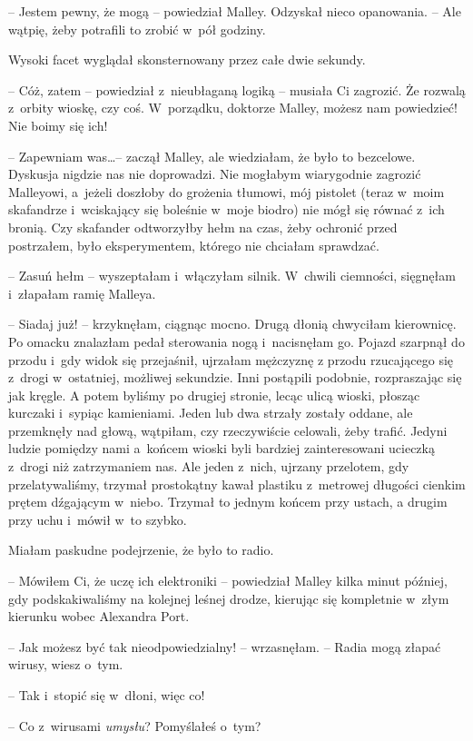 \documentclass[oneside,polish,11pt,sfheadings]{mwbk}
\begin{document}
-- Jestem pewny, że mogą -- powiedział Malley. Odzyskał nieco opanowania.
-- Ale wątpię, żeby potrafili to zrobić w~pół godziny.

Wysoki facet wyglądał skonsternowany przez całe dwie sekundy.

-- Cóż, zatem -- powiedział z~nieubłaganą logiką -- musiała Ci zagrozić. Że
rozwalą z~orbity wioskę, czy coś. W~porządku, doktorze Malley, możesz
nam powiedzieć! Nie boimy się ich!

-- Zapewniam was\ldots  -- zaczął Malley, ale wiedziałam, że było to
bezcelowe. Dyskusja nigdzie nas nie doprowadzi. Nie mogłabym wiarygodnie
zagrozić Malleyowi, a~jeżeli doszłoby do grożenia tłumowi, mój pistolet
(teraz w~moim skafandrze i~wciskający się boleśnie w~moje biodro) nie
mógł się równać z~ich bronią. Czy skafander odtworzyłby hełm na czas,
żeby ochronić przed postrzałem, było eksperymentem, którego nie chciałam
sprawdzać.

-- Zasuń hełm -- wyszeptałam i~włączyłam silnik. W~chwili ciemności,
sięgnęłam i~złapałam ramię Malleya.

-- Siadaj już! -- krzyknęłam, ciągnąc mocno. Drugą dłonią chwyciłam
kierownicę. Po omacku znalazłam pedał sterowania nogą i~nacisnęłam go.
Pojazd szarpnął do przodu i~gdy widok się przejaśnił, ujrzałam mężczyznę
z przodu rzucającego się z~drogi w~ostatniej, możliwej sekundzie. Inni
postąpili podobnie, rozpraszając się jak kręgle. A potem byliśmy po
drugiej stronie, lecąc ulicą wioski, płosząc kurczaki i~sypiąc
kamieniami. Jeden lub dwa strzały zostały oddane, ale przemknęły nad
głową, wątpiłam, czy rzeczywiście celowali, żeby trafić. Jedyni ludzie
pomiędzy nami a~końcem wioski byli bardziej zainteresowani ucieczką z~drogi niż zatrzymaniem nas. Ale jeden z~nich, ujrzany przelotem, gdy
przelatywaliśmy, trzymał prostokątny kawał plastiku z~metrowej długości
cienkim prętem dźgającym w~niebo. Trzymał to jednym końcem przy ustach,
a drugim przy uchu i~mówił w~to szybko.

Miałam paskudne podejrzenie, że było to radio.

-- Mówiłem Ci, że uczę ich elektroniki -- powiedział Malley kilka minut
później, gdy podskakiwaliśmy na kolejnej leśnej drodze, kierując się
kompletnie w~złym kierunku wobec Alexandra Port.

-- Jak możesz być tak nieodpowiedzialny! -- wrzasnęłam. -- Radia mogą
złapać wirusy, wiesz o~tym.

-- Tak i~stopić się w~dłoni, więc co!

-- Co z~wirusami \textit{umysłu}? Pomyślałeś o~tym?
\end{document}
